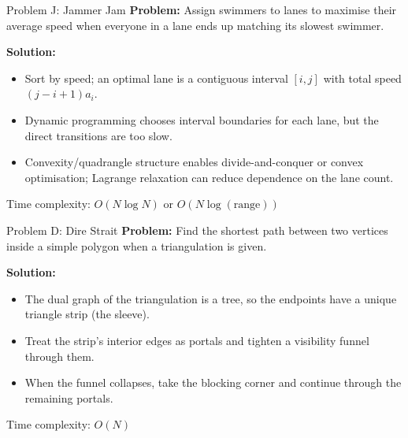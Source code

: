 \documentclass{beamer}
\newcommand{\problemframe}[5]{%
    \begin{frame}{Problem #1: #2}
        \textbf{Problem:} #3\par
        \vspace{0.5em}
        \textbf{Solution:}
        \begin{itemize}
            \setlength{\itemsep}{0.25em}
            #4
        \end{itemize}
        \vfill
        {\small\textcolor{kcpc-muted}{Time complexity: #5}\par}
    \end{frame}
}
\begin{document}
\problemframe{J}{Jammer Jam}
    {Assign swimmers to lanes to maximise their average speed when everyone in a lane ends up matching its slowest swimmer.}
    {\item<1-> Sort by speed; an optimal lane is a contiguous interval $[i,j]$ with total speed $(j-i+1)a_i$.
     \item<1-> Dynamic programming chooses interval boundaries for each lane, but the direct transitions are too slow.
     \item<1-> Convexity/quadrangle structure enables divide-and-conquer or convex optimisation; Lagrange relaxation can reduce dependence on the lane count.}
    {$O(N\log N)$ or $O(N\log(\text{range}))$}

\problemframe{D}{Dire Strait}
    {Find the shortest path between two vertices inside a simple polygon when a triangulation is given.}
    {\item<1-> The dual graph of the triangulation is a tree, so the endpoints have a unique triangle strip (the sleeve).
     \item<1-> Treat the strip's interior edges as portals and tighten a visibility funnel through them.
     \item<1-> When the funnel collapses, take the blocking corner and continue through the remaining portals.}
    {$O(N)$}
\end{document}
